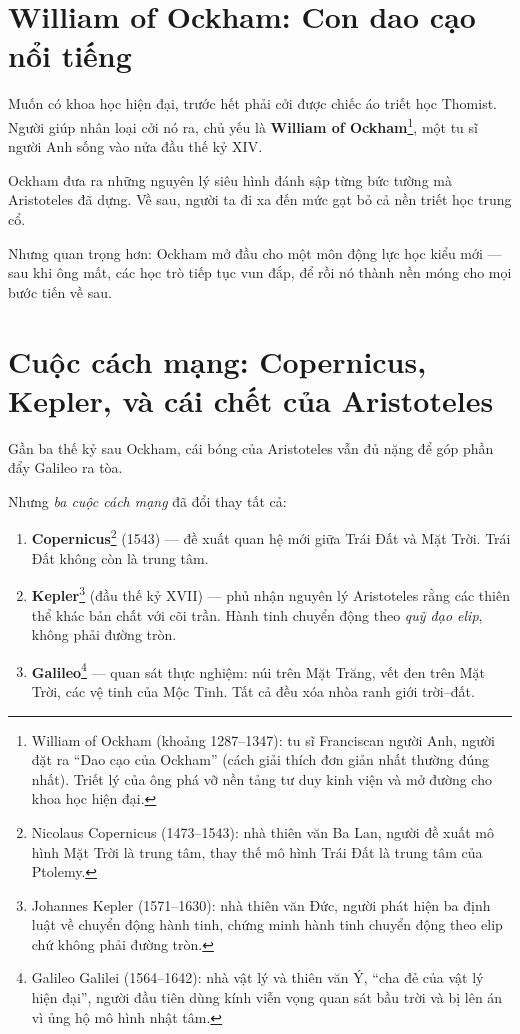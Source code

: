 \section{William of Ockham: Con dao cạo nổi tiếng}

Muốn có khoa học hiện đại, trước hết phải cởi được chiếc áo triết học Thomist. Người giúp nhân loại cởi nó ra, chủ yếu là \textbf{William of Ockham}\footnote{William of Ockham (khoảng 1287--1347): tu sĩ Franciscan người Anh, người đặt ra “Dao cạo của Ockham” (cách giải thích đơn giản nhất thường đúng nhất). Triết lý của ông phá vỡ nền tảng tư duy kinh viện và mở đường cho khoa học hiện đại.}, một tu sĩ người Anh sống vào nửa đầu thế kỷ XIV.

Ockham đưa ra những nguyên lý siêu hình đánh sập từng bức tường mà Aristoteles đã dựng. Về sau, người ta đi xa đến mức gạt bỏ cả nền triết học trung cổ.

Nhưng quan trọng hơn: Ockham mở đầu cho một môn động lực học kiểu mới — sau khi ông mất, các học trò tiếp tục vun đắp, để rồi nó thành nền móng cho mọi bước tiến về sau.


\section{Cuộc cách mạng: Copernicus, Kepler, và cái chết của Aristoteles}

Gần ba thế kỷ sau Ockham, cái bóng của Aristoteles vẫn đủ nặng để góp phần đẩy Galileo ra tòa.

Nhưng \emph{ba cuộc cách mạng} đã đổi thay tất cả:

\begin{enumerate}
  \item \textbf{Copernicus}\footnote{Nicolaus Copernicus (1473--1543): nhà thiên văn Ba Lan, người đề xuất mô hình Mặt Trời là trung tâm, thay thế mô hình Trái Đất là trung tâm của Ptolemy.} (1543) — đề xuất quan hệ mới giữa Trái Đất và Mặt Trời. Trái Đất không còn là trung tâm.
  \item \textbf{Kepler}\footnote{Johannes Kepler (1571--1630): nhà thiên văn Đức, người phát hiện ba định luật về chuyển động hành tinh, chứng minh hành tinh chuyển động theo elip chứ không phải đường tròn.} (đầu thế kỷ XVII) — phủ nhận nguyên lý Aristoteles rằng các thiên thể khác bản chất với cõi trần. Hành tinh chuyển động theo \emph{quỹ đạo elip}, không phải đường tròn.
  \item \textbf{Galileo}\footnote{Galileo Galilei (1564--1642): nhà vật lý và thiên văn Ý, ``cha đẻ của vật lý hiện đại'', người đầu tiên dùng kính viễn vọng quan sát bầu trời và bị lên án vì ủng hộ mô hình nhật tâm.} — quan sát thực nghiệm: núi trên Mặt Trăng, vết đen trên Mặt Trời, các vệ tinh của Mộc Tinh. Tất cả đều xóa nhòa ranh giới trời--đất.
\end{enumerate}

